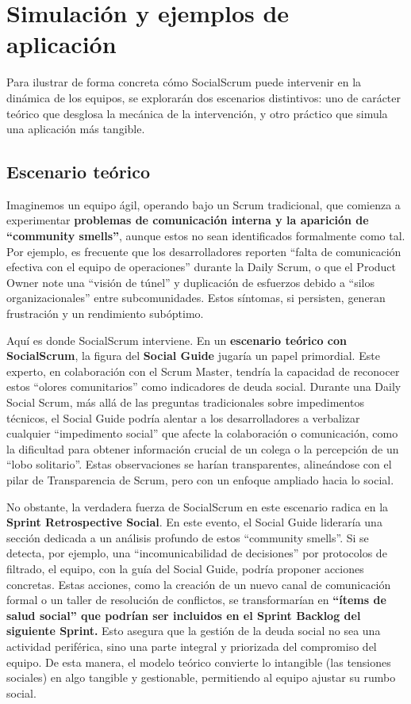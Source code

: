 \section{Simulación y ejemplos de aplicación}
Para ilustrar de forma concreta cómo SocialScrum puede intervenir en la dinámica de los equipos, se explorarán dos escenarios distintivos: uno de carácter teórico que desglosa la mecánica de la intervención, y otro práctico que simula una aplicación más tangible.

\subsection{Escenario teórico}
Imaginemos un equipo ágil, operando bajo un Scrum tradicional, que comienza a experimentar \textbf{problemas de comunicación interna y la aparición de ``community smells''}, aunque estos no sean identificados formalmente como tal. Por ejemplo, es frecuente que los desarrolladores reporten ``falta de comunicación efectiva con el equipo de operaciones'' durante la Daily Scrum, o que el Product Owner note una ``visión de túnel'' y duplicación de esfuerzos debido a ``silos organizacionales'' entre subcomunidades. Estos síntomas, si persisten, generan frustración y un rendimiento subóptimo.

Aquí es donde SocialScrum interviene. En un \textbf{escenario teórico con SocialScrum}, la figura del \textbf{Social Guide} jugaría un papel primordial. Este experto, en colaboración con el Scrum Master, tendría la capacidad de reconocer estos ``olores comunitarios'' como indicadores de deuda social. Durante una Daily Social Scrum, más allá de las preguntas tradicionales sobre impedimentos técnicos, el Social Guide podría alentar a los desarrolladores a verbalizar cualquier ``impedimento social'' que afecte la colaboración o comunicación, como la dificultad para obtener información crucial de un colega o la percepción de un ``lobo solitario''. Estas observaciones se harían transparentes, alineándose con el pilar de Transparencia de Scrum, pero con un enfoque ampliado hacia lo social.

No obstante, la verdadera fuerza de SocialScrum en este escenario radica en la \textbf{Sprint Retrospective Social}. En este evento, el Social Guide lideraría una sección dedicada a un análisis profundo de estos ``community smells''. Si se detecta, por ejemplo, una ``incomunicabilidad de decisiones'' por protocolos de filtrado, el equipo, con la guía del Social Guide, podría proponer acciones concretas. Estas acciones, como la creación de un nuevo canal de comunicación formal o un taller de resolución de conflictos, se transformarían en \textbf{``ítems de salud social'' que podrían ser incluidos en el Sprint Backlog del siguiente Sprint.} Esto asegura que la gestión de la deuda social no sea una actividad periférica, sino una parte integral y priorizada del compromiso del equipo. De esta manera, el modelo teórico convierte lo intangible (las tensiones sociales) en algo tangible y gestionable, permitiendo al equipo ajustar su rumbo social.

